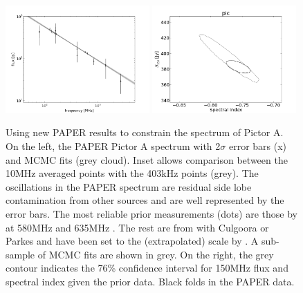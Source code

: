 \documentclass[preprint]{aastex}
\begin{document}
\begin{figure}[htbp]
\includegraphics[width=0.49\textwidth]{plots/pictor_spectrum.png}
\includegraphics[width=0.49\textwidth]{plots/pic_SI_MCMC.png}
\caption{
Using new PAPER results to constrain the spectrum of Pictor A.  On the left,
the PAPER Pictor A spectrum with 2$\sigma$ error bars (x) and  MCMC fits (grey
cloud). Inset allows comparison between the 10MHz averaged points with the
403kHz points (grey). The oscillations in the PAPER spectrum are residual side
lobe contamination from other sources and are well represented by the error
bars.  The most reliable prior measurements (dots) are those by
\cite{Wills:1975p9314} at 580MHz and 635MHz \citep{Perley:1997p9312}. The rest
are from with Culgoora \cite{Slee:1995p7541} or Parkes
\cite{Otrupcek:1991p8780} and have been set to the (extrapolated)
\citet{Baars:1977p9678} scale by  \cite{Kuehr:1981p9628}. A sub-sample of MCMC
fits are shown in grey. On the right, the grey contour indicates the 76\%
confidence interval for 150MHz flux and spectral index given the prior data.
Black folds in the PAPER data.
} \label{fig:pic_spectrum}
\end{figure}

%
%
\end{document}
